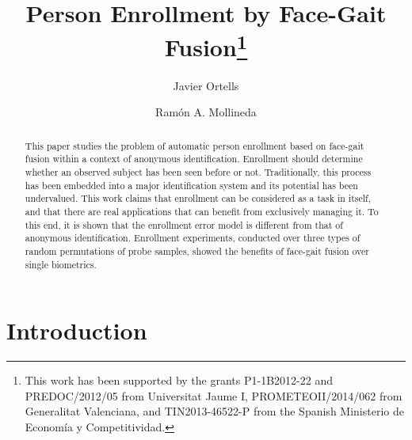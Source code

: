 \documentclass{llncs}
\begin{document}
%
\frontmatter          %
\renewcommand{\arraystretch}{1.2}
\setlength{\tabcolsep}{10pt}
%
\pagestyle{headings}  
%
\title{Person Enrollment by Face-Gait Fusion\thanks{This work has been supported by the grants P1-1B2012-22 and PREDOC/2012/05 from Universitat Jaume I, PROMETEOII/2014/062 from Generalitat Valenciana, and TIN2013-46522-P from the Spanish Ministerio de Econom\'ia y Competitividad.}}
%

\author{Javier Ortells \and Ram\'on A. Mollineda}


%

\maketitle              

\begin{abstract}
This paper studies the problem of automatic person enrollment based on face-gait fusion within a context of anonymous identification. Enrollment should determine whether an observed subject has been seen before or not. Traditionally, this process has been embedded into a major identification system and its potential has been undervalued. This work claims that enrollment can be considered as a task in itself, and that there are real applications that can benefit from exclusively managing it. To this end, it is shown that the enrollment error model is different from that of anonymous identification. Enrollment experiments, conducted over three types of random permutations of probe samples, showed the benefits of face-gait fusion over single biometrics.

\vspace{-2mm}
\end{abstract}
%
\section{Introduction}\label{sec:introduction}
\end{document}
